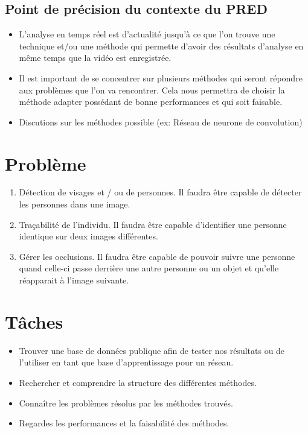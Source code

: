 \documentclass[11pt]{report}
\begin{document}
	\subsection{Point de précision du contexte du PRED}
		\begin{itemize}
			\item L'analyse en temps réel est d'actualité jusqu'à ce que l'on trouve une technique et/ou une méthode qui permette d'avoir des résultats d'analyse en même temps que la vidéo est enregistrée.\\
			\item Il est important de se concentrer sur plusieurs méthodes qui seront répondre aux problèmes que l'on va rencontrer. Cela nous permettra de choisir la méthode adapter possédant de bonne performances et qui soit faisable.\\
			\item Discutions sur les méthodes possible (ex: Réseau de neurone de convolution)
		\end{itemize}

\section{Problème}
	\begin{enumerate}
		\item Détection de visages et / ou de personnes. Il faudra être capable de détecter les personnes dans une image.\\
		\item Traçabilité de l'individu. Il faudra être capable d'identifier une personne identique sur deux images différentes.\\
		\item Gérer les occlusions. Il faudra être capable de pouvoir suivre une personne quand celle-ci passe derrière une autre personne ou un objet et qu'elle réapparait à l'image suivante.
	\end{enumerate}

\section{Tâches}
	\begin{itemize}
		\item Trouver une base de données publique afin de tester nos résultats ou de l'utiliser en tant que base d'apprentissage pour un réseau.\\
		\item Rechercher et comprendre la structure des différentes méthodes.\\
		\item Connaître les problèmes résolus par les méthodes trouvés.\\
		\item Regardes les performances et la faisabilité des méthodes.
	\end{itemize}
\end{document}
